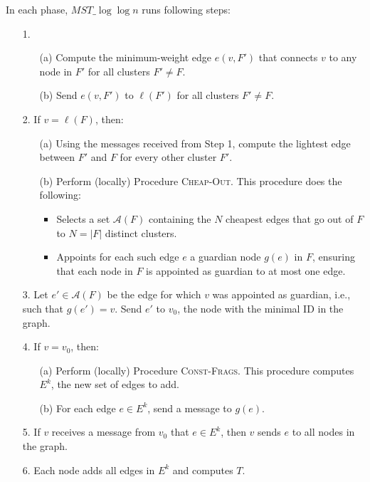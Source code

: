 \documentclass[english, 12pt, a4paper, elec, utf8, a-2b, online]{aaltothesis}
\newcommand{\mstalgo}{$MST\_\log\log{n}$}
\begin{document}
In each phase, \mstalgo{} runs following steps:
\begin{itemize}
	\item[1.] 
	\begin{itemize}
			\item[(a)] Compute the minimum-weight edge $e(v, F')$ that connects $v$ to any node in $F'$ for all clusters $F' \neq F$.
			\item[(b)] Send $e(v, F')$ to $\ell(F')$ for all clusters $F' \neq F$.
	\end{itemize}

	\item[2.] If $v = \ell(F)$, then:
	\begin{itemize}
			\item[(a)] Using the messages received from Step 1, compute the lightest edge between $F'$ and $F$ for every other cluster $F'$.
			\item[(b)] Perform (locally) Procedure \textsc{Cheap-Out}. This procedure does the following:
			\begin{itemize}
					\item Selects a set $\mathcal{A}(F)$ containing the $N$ cheapest edges that go out of $F$ to $N = |F|$ distinct clusters.
					\item Appoints for each such edge $e$ a guardian node $g(e)$ in $F$, ensuring that each node in $F$ is appointed as guardian to at most one edge.
			\end{itemize}
	\end{itemize}

	\item[3.] Let $e' \in \mathcal{A}(F)$ be the edge for which $v$ was appointed as guardian, i.e., such that $g(e') = v$. Send $e'$ to $v_0$, the node with the minimal ID in the graph.
	
	\item[4.] If $v = v_0$, then:
	\begin{itemize}
			\item[(a)] Perform (locally) Procedure \textsc{Const-Frags}. This procedure computes $E^k$, the new set of edges to add.
			\item[(b)] For each edge $e \in E^k$, send a message to $g(e)$.
	\end{itemize}

	\item[5.] If $v$ receives a message from $v_0$ that $e \in E^k$, then $v$ sends $e$ to all nodes in the graph.

	\item[6.] Each node adds all edges in $E^k$ and computes $T$.
\end{itemize}
\end{document}
